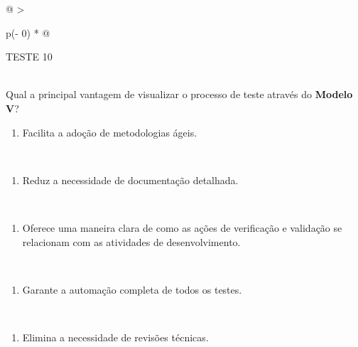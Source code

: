 \documentclass[
]{book}
\providecommand{\tightlist}{%
  \setlength{\itemsep}{0pt}\setlength{\parskip}{0pt}}
\begin{document}
\begin{longtable}[]{@{}
  >{\raggedright\arraybackslash}p{(\columnwidth - 0\tabcolsep) * }@{}}
\toprule\noalign{}
\begin{minipage}[b]{\linewidth}\raggedright
TESTE 10
\end{minipage} \\
\midrule\noalign{}
\endhead
\bottomrule\noalign{}
\endlastfoot
Qual a principal vantagem de visualizar o processo de teste através do \textbf{Modelo V}? \\
\begin{minipage}[t]{\linewidth}\raggedright
\begin{enumerate}
\def\labelenumi{\Alph{enumi})}
\tightlist
\item
  Facilita a adoção de metodologias ágeis.
\end{enumerate}
\end{minipage} \\
\begin{minipage}[t]{\linewidth}\raggedright
\begin{enumerate}
\def\labelenumi{\Alph{enumi})}
\setcounter{enumi}{1}
\tightlist
\item
  Reduz a necessidade de documentação detalhada.
\end{enumerate}
\end{minipage} \\
\begin{minipage}[t]{\linewidth}\raggedright
\begin{enumerate}
\def\labelenumi{\Alph{enumi})}
\setcounter{enumi}{2}
\tightlist
\item
  Oferece uma maneira clara de como as ações de verificação e validação se relacionam com as atividades de desenvolvimento.
\end{enumerate}
\end{minipage} \\
\begin{minipage}[t]{\linewidth}\raggedright
\begin{enumerate}
\def\labelenumi{\Alph{enumi})}
\setcounter{enumi}{3}
\tightlist
\item
  Garante a automação completa de todos os testes.
\end{enumerate}
\end{minipage} \\
\begin{minipage}[t]{\linewidth}\raggedright
\begin{enumerate}
\def\labelenumi{\Alph{enumi})}
\setcounter{enumi}{4}
\tightlist
\item
  Elimina a necessidade de revisões técnicas.
\end{enumerate}
\end{minipage} \\
\end{longtable}
\end{document}
